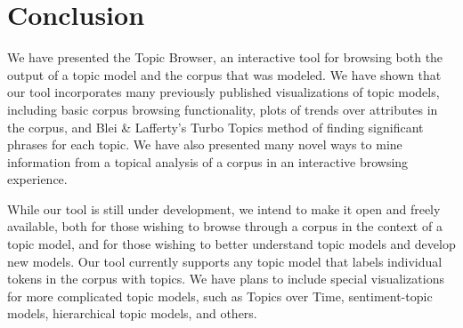 \documentclass{article}
\begin{document}
\section{Conclusion}

We have presented the Topic Browser, an interactive tool for browsing both the
output of a topic model and the corpus that was modeled.  We have shown that
our tool incorporates many previously published visualizations of topic models,
including basic corpus browsing functionality, plots of trends over attributes
in the corpus, and Blei \& Lafferty's Turbo Topics method of finding
significant phrases for each topic.  We have also presented many novel ways to
mine information from a topical analysis of a corpus in an interactive browsing
experience.

While our tool is still under development, we intend to make it open and freely
available, both for those wishing to browse through a corpus in the context of
a topic model, and for those wishing to better understand topic models and
develop new models.  Our tool currently supports any topic model that labels
individual tokens in the corpus with topics.  We have plans to include special
visualizations for more complicated topic models, such as Topics over Time,
sentiment-topic models, hierarchical topic models, and others.



\end{document}
